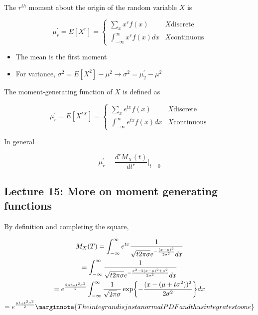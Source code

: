 \documentclass[10pt]{article}
\begin{document}
\begin{definition}
The $ r^{th} $  moment about the origin of the random variable $ X $  is

\begin{equation}
	\mu^\prime_r = E[X^r] = \begin{cases}
		\sum_x x^r f(x) & X \text{discrete} \\
		\int_{-\infty}^{\infty} x^r f(x) dx & X \text{continuous} 
	\end{cases}
	\label{eq:286:moment_dfn}
\end{equation}
\end{definition}

\begin{itemize}
	\item The mean is the first moment
	\item For variance, $ \sigma^2 = E[X^2] - \mu^2 \rightarrow \sigma^2 = \mu^\prime_2 - \mu^2 $
\end{itemize}

\begin{definition}
The moment-generating function of $ X $  is defined as

\begin{equation}
	\mu^\prime_r = E[X^{tX}] = \begin{cases}
		\sum_x e^{tx} f(x) & X \text{discrete} \\
		\int_{-\infty}^{\infty} e^{tx} f(x) dx & X \text{continuous} 
	\end{cases}
	\label{eq:286:moment_gen_fn}
\end{equation}

\end{definition}

In general 

\begin{equation}
	\mu^\prime_r = \frac{d^r M_X(t)}{dt^r} \biggr\rvert_{t=0}
\end{equation}

\subsection{Lecture 15: More on moment generating functions}

By definition and completing the square,

\begin{multline}
	M_X(T) = \int_{-\infty}^{\infty}  e^{tx} \frac{1}{\sqrt{t{2\pi}\sigma} e^{-\frac{(x-\mu)^2}{2\sigma^2}} dx } \\
	= \int_{-\infty}^{\infty}  \frac{1}{\sqrt{t{2\pi}\sigma} e^{-\frac{x^2 - 2(x-\mu)^2 + \mu^2}{2\sigma^2}} dx } \\
	= e^{\frac{2\mu t + t^2 \sigma^2}{2}} \int_{-\infty}^{\infty} \frac{1}{\sqrt{2\pi} \sigma} \exp{-\frac{(x - (\mu + t \sigma^2))^2}{2\sigma^2}} dx \\
	= e^{\frac{\mu t + t^2 \sigma^2}{2}} 
	\marginnote{The integrand is just a normal PDF and thus integrates to one}
\end{multline}
\end{document}
